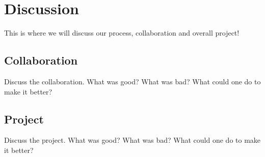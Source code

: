 \section{Discussion}
This is where we will discuss our process, collaboration and overall project!
\subsection{Collaboration}
Discuss the collaboration. What was good? What was bad? What could one do to make it better?
\subsection{Project}
Discuss the project. What was good? What was bad? What could one do to make it better?